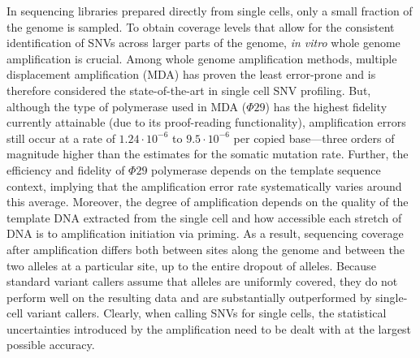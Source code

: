 \documentclass[fleqn,12pt,inline]{wlscirep}
\begin{document}
In sequencing libraries prepared directly from single cells, only a small fraction of the genome is sampled.
To obtain coverage levels that allow for the consistent identification of SNVs across larger parts of the genome, \textit{in vitro} whole genome amplification is crucial. 
Among whole genome amplification methods, multiple displacement amplification (MDA\cite{dean_comprehensive_2002}) has proven the least error-prone and is therefore considered the state-of-the-art in single cell SNV profiling\cite{de_bourcy_quantitative_2014,hou_comparison_2015,huang_single-cell_2015,estevez-gomez_comparison_2018}.
But, although the type of polymerase used in MDA ($\Phi29$) has the highest fidelity currently attainable (due to its proof-reading functionality), amplification errors still occur at a rate of $1.24 \cdot 10^{-6}$ to $9.5 \cdot 10^{-6}$ per copied base\cite{paez_genome_2004,wang_genome-wide_2012,wang_clonal_2014,de_bourcy_quantitative_2014,lodato_somatic_2015}---three orders of magnitude higher than the estimates for the somatic mutation rate.
Further, the efficiency and fidelity of $\Phi29$ polymerase depends on the template sequence context\cite{de_paz_high-resolution_2018}, implying that the amplification error rate systematically varies around this average.
Moreover, the degree of amplification depends on the quality of the template DNA extracted from the single cell\cite{baumer_exploring_2018} and how accessible each stretch of DNA is to amplification initiation via priming\cite{picher_trueprime_2016}.
As a result, sequencing coverage after amplification differs both between sites along the genome and between the two alleles at a particular site, up to the entire dropout of alleles\cite{spits_optimization_2006}.
Because standard variant callers assume that alleles are uniformly covered, they do not perform well on the resulting data and are substantially outperformed by  single-cell  variant callers\cite{zafar_monovar:_2016,dong_accurate_2017}.
Clearly, when calling SNVs for single cells, the statistical uncertainties introduced by the amplification need to be dealt with at the largest possible accuracy.
\end{document}
